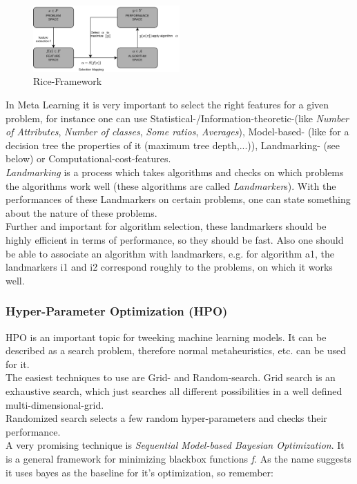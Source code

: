 \documentclass[12pt,a4paper]{article}
\begin{document}
\begin{figure}[ht]
    \begin{center}
    \includegraphics[width=0.5\textwidth]{imgs/rice-framework.png}
    \caption{Rice-Framework}
    \label{fig:rice-framework}
    \end{center}
\end{figure}

\noindent In Meta Learning it is very important to select the right features for a given problem, for instance one can use Statistical-/Information-theoretic-(like \textit{Number of Attributes}, \textit{Number of classes}, \textit{Some ratios}, \textit{Averages}), Model-based- (like for a decision tree the properties of it (maximum tree depth,...)), Landmarking- (see below) or Computational-cost-features.\\
\textit{Landmarking} is a process which takes algorithms and checks on which problems the algorithms work well (these algorithms are called \textit{Landmarker}s). With the performances of these Landmarkers on certain problems, one can state something about the nature of these problems.\\
Further and important for algorithm selection, these landmarkers should be highly efficient in terms of performance, so they should be fast. Also one should be able to associate an algorithm with landmarkers, e.g. for algorithm a1, the landmarkers i1 and i2 correspond roughly to the problems, on which it works well.\\

\subsubsection{Hyper-Parameter Optimization (HPO)}

\noindent HPO is an important topic for tweeking machine learning models. It can be described as a search problem, therefore normal metaheuristics, etc. can be used for it.\\
The easiest techniques to use are Grid- and Random-search. Grid search is an exhaustive search, which just searches all different possibilities in a well defined multi-dimensional-grid.\\
Randomized search selects a few random hyper-parameters and checks their performance.\\[1em]
A very promising technique is \textit{Sequential Model-based Bayesian Optimization}. It is a general framework for minimizing blackbox functions \textit{f}. As the name suggests it uses bayes as the baseline for it's optimization, so remember:
\end{document}
